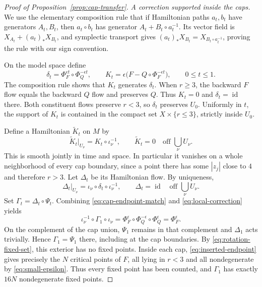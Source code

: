 \begin{proof}[Proof of Proposition~\ref{prop:cap-transfer}]
\smallskip
\noindent\emph{A correction supported inside the caps.}
We use the elementary composition rule that if Hamiltonian paths
$a_t,b_t$ have generators $A_t,B_t$, then $a_t\circ b_t$ has generator
$A_t+B_t\circ a_t^{-1}$.  Its vector field is
$X_{A_t}+(a_t)_*X_{B_t}$, and symplectic transport gives
$(a_t)_*X_{B_t}=X_{B_t\circ a_t^{-1}}$, proving the rule with our
sign convention.

On the model space define
\begin{equation}\label{eq:local-correction}
 \delta_t=\Phi_F^{\epsilon t}\circ\Phi_Q^{-\epsilon t},
 \qquad
 K_t=\epsilon\bigl(F-Q\circ\Phi_F^{-\epsilon t}\bigr),
 \qquad 0\le t\le1.
\end{equation}
The composition rule shows that $K_t$ generates $\delta_t$.
When $r\ge3$, the backward $F$ flow equals the backward $Q$ flow and
preserves $Q$.  Thus $K_t=0$ and $\delta_t=\operatorname{id}$ there.
Both constituent flows preserve $r<3$, so $\delta_t$ preserves $U_0$.
Uniformly in $t$, the support of $K_t$ is contained in the compact
set $X\times\{r\le3\}$, strictly inside $U_0$.

Define a Hamiltonian $\widetilde K_t$ on $M$ by
\[
 \widetilde K_t|_{U_\nu}=K_t\circ\iota_\nu^{-1},
 \qquad
 \widetilde K_t=0\quad\text{off }\bigcup_\nu U_\nu.
\]
This is smooth jointly in time and space.  In particular it vanishes
on a whole neighborhood of every cap boundary, since a point there
has some $|z_j|$ close to $4$ and therefore $r>3$.
Let $\Delta_t$ be its Hamiltonian flow.  By uniqueness,
\[
 \Delta_t|_{U_\nu}
 =\iota_\nu\circ\delta_t\circ\iota_\nu^{-1},
 \qquad
 \Delta_t=\operatorname{id}\quad\text{off }\bigcup_\nu U_\nu.
\]
Set $\Gamma_t=\Delta_t\circ\Psi_t$.  Combining
\eqref{eq:cap-endpoint-match} and \eqref{eq:local-correction} yields
\begin{equation}\label{eq:inserted-endpoint}
 \iota_\nu^{-1}\circ\Gamma_1\circ\iota_\nu
 =\Phi_F^\epsilon\circ\Phi_Q^{-\epsilon}\circ\Phi_Q^\epsilon
 =\Phi_F^\epsilon.
\end{equation}
On the complement of the cap union, $\Psi_1$ remains in that
complement and $\Delta_1$ acts trivially.  Hence $\Gamma_1=\Psi_1$
there, including at the cap boundaries.  By
\eqref{eq:rotation-fixed-set}, this exterior has no fixed points.
Inside each cap, \eqref{eq:inserted-endpoint} gives precisely the
$N$ critical points of $F$, all lying in $r<3$ and all nondegenerate
by \eqref{eq:small-epsilon}.  Thus every fixed point has been counted,
and $\Gamma_1$ has exactly $16N$ nondegenerate fixed points.


\end{proof}
